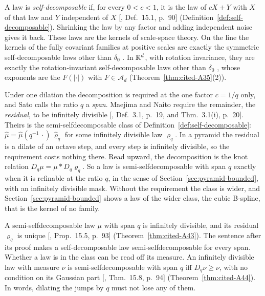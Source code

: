 A law is \emph{self-decomposable} if, for every $0 < c < 1$, it is the law of $cX + Y$ with $X$ of that
law and $Y$ independent of $X$ [, Def.~15.1, p.~90]
(Definition~\ref{def:self-decomposable}). Shrinking the law by any factor and adding independent
noise gives it back. These laws are the kernels of scale-space theory. On the line the kernels of the
fully covariant families at positive scales are exactly the symmetric self-decomposable laws other
than $\delta_0$ . In $\mathbb{R}^d$, with
rotation invariance, they are exactly the rotation-invariant self-decomposable laws other than
$\delta_0$ , whose exponents are the $F(|\cdot|)$ with
$F \in \mathcal{A}_d$ (Theorem~\ref{thm:cited-A35}(2)).

Under one dilation the decomposition is required at the one factor $c = 1/q$ only, and Sato calls
the ratio $q$ a \emph{span}. Maejima and Naito require the remainder, the \emph{residual}, to be
infinitely divisible [, Def.~3.1, p.~19, and Thm.~3.1(i), p.~20]. Theirs is the
semi-selfdecomposable class of Definition~\ref{def:self-decomposable}:
$\widehat\mu = \widehat\mu(q^{-1}\,\cdot)\,\widehat\varrho_q$ for some infinitely divisible law
$\varrho_q$. In a pyramid the residual is a dilate of an octave step, and every step is infinitely
divisible, so the requirement costs nothing there. Read upward, the decomposition is the knot
relation $D_q\mu = \mu * D_q\varrho_q$. So a law is semi-selfdecomposable with span $q$ exactly when
it is refinable at the ratio $q$, in the sense of Section~\ref{sec:pyramid-bounded}, with an
infinitely divisible mask. Without the requirement the class is wider, and
Section~\ref{sec:pyramid-bounded} shows a law of the wider class, the cubic B-spline, that is the
kernel of no family.

A semi-selfdecomposable law $\mu$ with span $q$ is infinitely divisible, and its residual
$\varrho_q$ is unique [, Prop.~15.5, p.~93] (Theorem~\ref{thm:cited-A43}).
The sentence after its proof makes a self-decomposable law semi-selfdecomposable for every span. Whether a
law is in the class can be read off its \Levy{} measure. An
infinitely divisible law with \Levy{} measure $\nu$ is semi-selfdecomposable with span $q$ iff
$D_q\nu \ge \nu$, with no condition on its Gaussian part [, Thm.~15.8,
p.~94] (Theorem~\ref{thm:cited-A44}). In words, dilating the jumps by $q$ must not lose any of
them.

